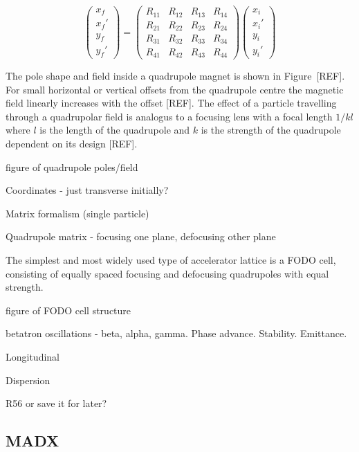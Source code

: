 \begin{equation}
\left( \begin{array}{c} x_f \\ x_f' \\ y_f \\ y_f' \end{array} \right)
=
\left( \begin{array}{cccc} R_{11} & R_{12} & R_{13} & R_{14} \\ R_{21} & R_{22} & R_{23} & R_{24} \\ R_{31} & R_{32} & R_{33} & R_{34} \\ R_{41} & R_{42} & R_{43} & R_{44} \end{array} \right)
\left( \begin{array}{c} x_i \\ x_i' \\ y_i \\ y_i' \end{array} \right)
\end{equation}

The pole shape and field inside a quadrupole magnet is shown in Figure~[REF]. For small horizontal or vertical offsets from the quadrupole centre the magnetic field linearly increases with the offset [REF]. The effect of a particle travelling through a quadrupolar field is analogus to a focusing lens with a focal length \(1/kl\) where \(l\) is the length of the quadrupole and \(k\) is the strength of the quadrupole dependent on its design [REF]. 


figure of quadrupole poles/field

Coordinates - just transverse initially?

Matrix formalism (single particle)

Quadrupole matrix - focusing one plane, defocusing other plane

The simplest and most widely used type of accelerator lattice is a FODO cell, consisting of equally spaced focusing and defocusing quadrupoles with equal strength.

figure of FODO cell structure

betatron oscillations - beta, alpha, gamma. Phase advance. Stability. Emittance.

Longitudinal

Dispersion

R56 or save it for later?

\subsection{MADX}
\label{ss:madx}

